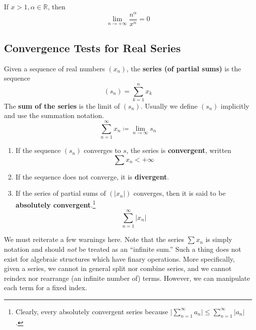   \begin{example}
    If $x > 1, \alpha \in \mathbb{R}$, then 
    \begin{equation}
      \lim_{n \rightarrow +\infty} \frac{n^\alpha}{x^n} = 0
    \end{equation} 
  \end{example}
 
\subsection{Convergence Tests for Real Series}

  \begin{definition}
    Given a sequence of real numbers $(x_n)$, the \textbf{series (of partial sums)} is the sequence 
    \begin{equation}
      (s_n) = \sum_{k=1}^n x_k
    \end{equation}
    The \textbf{sum of the series} is the limit of $(s_n)$. Usually we define $(s_n)$ implicitly and use the summation notation. 
    \begin{equation}
      \sum_{n=1}^\infty x_n \coloneqq \lim_{n \rightarrow \infty} s_n
    \end{equation}
    \begin{enumerate}
      \item If the sequence $(s_n)$ converges to $s$, the series is \textbf{convergent}, written 
      \begin{equation}
        \sum x_n < +\infty
      \end{equation}
      \item If the sequence does not converge, it is \textbf{divergent}. 
      \item If the series of partial sums of $(|x_n|)$ converges, then it is said to be \textbf{absolutely convergent}.\footnote{Clearly, every absolutely convergent series because $\big|\sum_{n=1}^\infty a_n \big| \leq \sum_{n=1}^\infty |a_n|$. }
      \begin{equation}
        \sum_{n=1}^\infty |x_n|
      \end{equation}
    \end{enumerate}
  \end{definition}

  We must reiterate a few warnings here. Note that the series $\sum x_n$ is simply notation and should \textit{not} be treated as an ``infinite sum.'' Such a thing does not exist for algebraic structures which have finary operations. More specifically, given a series, we cannot in general split nor combine series, and we cannot reindex nor rearrange (an infinite number of) terms. However, we can manipulate each term for a fixed index. 

